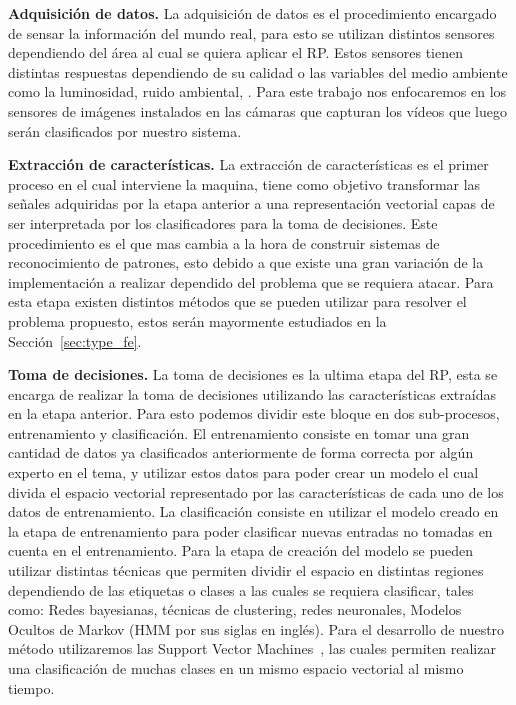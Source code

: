 	\textbf{Adquisición de datos.} La adquisición de datos es el procedimiento encargado de sensar la información del mundo real, para esto se utilizan distintos sensores dependiendo del área al cual se quiera aplicar el RP. Estos sensores tienen distintas respuestas dependiendo de su calidad o las variables del medio ambiente como la luminosidad, ruido ambiental, \etc. Para este trabajo nos enfocaremos en los sensores de imágenes instalados en las cámaras que capturan los vídeos que luego serán clasificados por nuestro sistema.
	
	\textbf{Extracción de características.} La extracción de características es el primer proceso en el cual interviene la maquina, tiene como objetivo transformar las señales adquiridas por la etapa anterior a una representación vectorial capas de ser interpretada por los clasificadores para la toma de decisiones. Este procedimiento es el que mas cambia a la hora de construir sistemas de reconocimiento de patrones, esto debido a que existe una gran variación de la implementación a realizar dependido del problema que se requiera atacar. Para esta etapa existen distintos métodos que se pueden utilizar para resolver el problema propuesto, estos serán mayormente estudiados en la Sección~\ref{sec:type_fe}.
	
	\textbf{Toma de decisiones.} La toma de decisiones es la ultima etapa del RP, esta se encarga de realizar la toma de decisiones utilizando las características extraídas en la etapa anterior. Para esto podemos dividir este bloque en dos sub-procesos, entrenamiento y clasificación. El entrenamiento consiste en tomar una gran cantidad de datos ya clasificados anteriormente de forma correcta por algún experto en el tema, y utilizar estos datos para poder crear un modelo el cual divida el espacio vectorial representado por las características de cada uno de los datos de entrenamiento. La clasificación consiste en utilizar el modelo creado en la etapa de entrenamiento para poder clasificar nuevas entradas no tomadas en cuenta en el entrenamiento. Para la etapa de creación del modelo se pueden utilizar distintas técnicas que permiten dividir el espacio en distintas regiones dependiendo de las etiquetas o clases a las cuales se requiera clasificar, tales como: Redes bayesianas, técnicas de clustering, redes neuronales, Modelos Ocultos de Markov (HMM por sus siglas en inglés). Para el desarrollo de nuestro método utilizaremos las Support Vector Machines~\cite{Cortes1995,Hearst1998}, las cuales permiten realizar una clasificación de muchas clases en un mismo espacio vectorial al mismo tiempo. 


